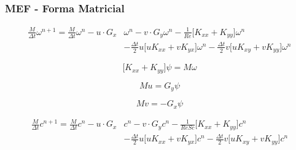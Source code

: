 \begin{frame} 
 \frametitle{\Large MEF - Forma Matricial}
\vspace{-1cm}
\small
\begin{equation*}
\begin{aligned}
 \frac{M}{\Delta t} \omega^{n+1} = \frac{M}{\Delta t} \omega^{n} - u \cdot G_x & \omega^{n} - v \cdot G_y \omega^{n} 
 - \frac{1}{\textit{Re}} \Big[ K_{xx} + K_{yy} \Big] \omega^{n}  
 \\[5pt]
 & - \frac{\Delta t}{2} u \Big[ u K_{xx} + v K_{yx} \Big] \omega^{n} 
 - \frac{\Delta t}{2} v \Big[ u K_{xy} + v K_{yy} \Big] \omega^{n} 
\end{aligned}
\end{equation*}

\vspace{0.2cm}
\begin{equation*}
 \Big[ K_{xx} + K_{yy} \Big] \psi = M \omega
\end{equation*}

\begin{equation*}
 Mu = G_y \psi
\end{equation*}

\begin{equation*}
 Mv = - G_x \psi
\end{equation*}

\vspace{-0.3cm}
\begin{equation*}
\begin{aligned}
 \frac{M}{\Delta t} c^{n+1} = \frac{M}{\Delta t} c^{n}  - u \cdot G_x & c^{n} - v \cdot G_y c^{n} 
 - \frac{1}{\textit{ReSc}} \Big[ K_{xx} + K_{yy} \Big] c^{n}  
 \\[5pt]
 & - \frac{\Delta t}{2} u \Big[ u K_{xx} + v K_{yx} \Big] c^{n} 
 - \frac{\Delta t}{2} v \Big[ u K_{xy} + v K_{yy} \Big] c^{n} 
\end{aligned}
\end{equation*}
\end{frame}

